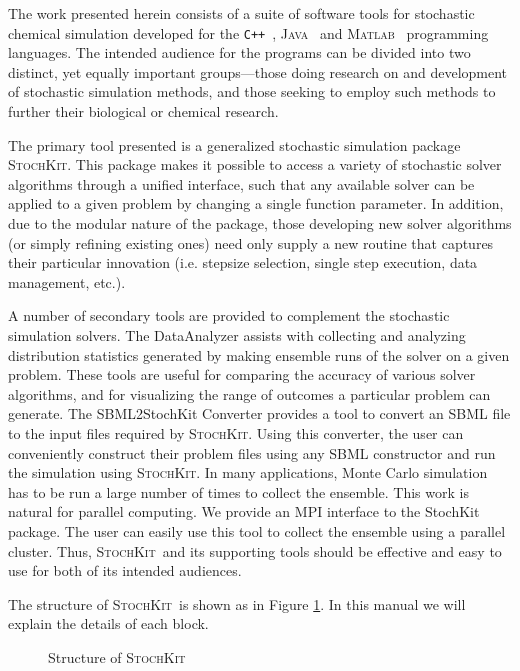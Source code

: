 \documentclass[12pt]{article}
\newcommand{\matlab}{\textsc{Matlab}}
\newcommand{\java}{\textsc{Java}}
\newcommand{\cpp}{\texttt{C++}}%
\newcommand{\sspack}{\textsc{StochKit}}
\begin{document}
The work presented herein consists of a suite of software tools
for stochastic chemical simulation developed for the \cpp\
\cite{c++}, \java\ \cite{java} and \matlab\ \cite{matlab}
programming languages. The intended audience for the programs can
be divided into two distinct, yet equally important groups---those
doing research on and development of stochastic simulation
methods, and those seeking to employ such methods to further their
biological or chemical research.

The primary tool presented is a generalized stochastic simulation
package \sspack. This package makes it possible
to access a variety of stochastic solver algorithms through a unified
interface, such that any available solver can be applied to a given
problem by changing a single function parameter.  In addition, due to
the modular nature of the package, those developing new solver
algorithms (or simply refining existing ones) need only supply a new
routine that captures their particular innovation (i.e. stepsize
selection, single step execution, data management, etc.).

A number of secondary tools are provided to complement the
stochastic simulation solvers. The DataAnalyzer assists with
collecting and analyzing distribution statistics generated by making
ensemble runs of the solver on a given problem.  These tools are
useful for comparing the accuracy of various solver algorithms, and
for visualizing the range of outcomes a particular problem can
generate. The SBML2StochKit Converter provides a tool to convert an
SBML \cite{sbml} file to the input files required by \sspack. Using
this converter, the user can conveniently construct their problem files
using any SBML constructor and run the simulation using \sspack.
In many applications, Monte Carlo simulation has to be run a large number of
times to collect the ensemble. This work is natural for parallel computing.
We provide an MPI interface to the StochKit package. The user can easily
use this tool to collect the ensemble using a parallel cluster.
Thus, \sspack \ and its supporting tools should be effective and easy to
use for both of its intended audiences.

The structure of \sspack \ is shown as in Figure \ref{code_structure}.
In this manual we will explain the details of each block.

\begin{figure} \label{code_structure}
\vspace{11pt}
\centerline{}
\caption{Structure of \sspack}
\vspace{11pt}
\end{figure}
\end{document}
